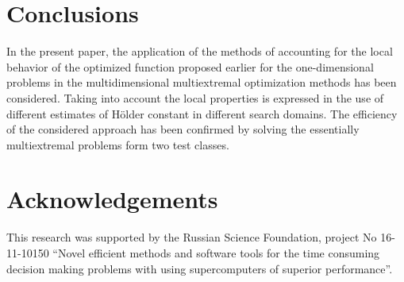 \documentclass[procedia]{easychair}
\begin{document}
\section{Conclusions}
In the present paper, the application of the methods of accounting for the local
behavior of the optimized function proposed earlier for the one-dimensional problems
in the multidimensional multiextremal optimization methods has been considered. Taking
into account the local properties is expressed in the use of different estimates of Hölder
constant in different search domains. The efficiency of the considered approach has been
confirmed by solving the essentially multiextremal problems form two test classes.

\section{Acknowledgements}
This research was supported by the Russian Science Foundation, project No 16-11-10150
“Novel efficient methods and software tools for the time consuming decision making problems
with using supercomputers of superior performance”.

%
\label{sect:bib}

%
%
%



\end{document}
